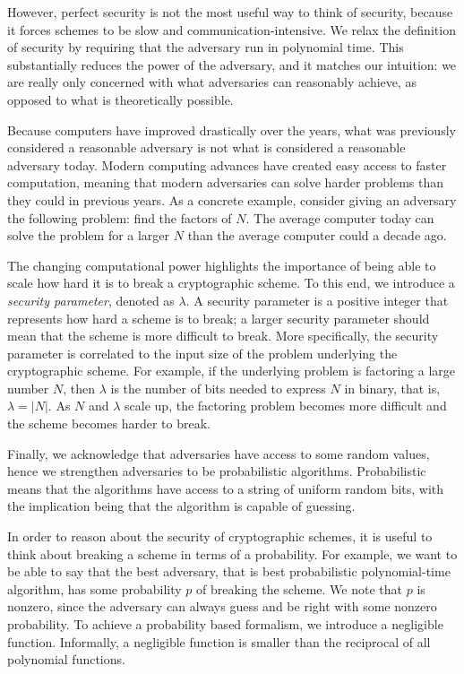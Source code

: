 However, perfect security is not the most useful way to think of security, because it forces schemes to be slow and communication-intensive.
We relax the definition of security by requiring that the adversary run in polynomial time. 
This substantially reduces the power of the adversary, and it matches our intuition: we are really only concerned with what adversaries can reasonably achieve, as opposed to what is theoretically possible. 

Because computers have improved drastically over the years, what was previously considered a reasonable adversary is not what is considered a reasonable adversary today. 
Modern computing advances have created easy access to faster computation, meaning that modern adversaries can solve harder problems than they could in previous years. 
As a concrete example, consider giving an adversary the following problem: find the factors of $N$. 
The average computer today can solve the problem for a larger $N$ than the average computer could a decade ago.

The changing computational power highlights the importance of being able to scale how hard it is to break a cryptographic scheme.
To this end, we introduce a \textit{security parameter}, denoted as $\lambda$.
A security parameter is a positive integer that represents how hard a scheme is to break; a larger security parameter should mean that the scheme is more difficult to break. 
More specifically, the security parameter is correlated to the input size of the problem underlying the cryptographic scheme. 
For example, if the underlying problem is factoring a large number $N$, then $\lambda$ is the number of bits needed to express $N$ in binary, that is, $\lambda = |N|$.
As $N$ and $\lambda$ scale up, the factoring problem becomes more difficult and the scheme becomes harder to break. 

Finally, we acknowledge that adversaries have access to some random values, hence we strengthen adversaries to be probabilistic algorithms. 
Probabilistic means that the algorithms have access to a string of uniform random bits, with the implication being that the algorithm is capable of guessing. 

In order to reason about the security of cryptographic schemes, it is useful to think about breaking a scheme in terms of a probability. 
For example, we want to be able to say that the best adversary, that is best probabilistic polynomial-time algorithm, has some probability $p$ of breaking the scheme. 
We note that $p$ is nonzero, since the adversary can always guess and be right with some nonzero probability. 
To achieve a probability based formalism, we introduce a negligible function.
Informally, a negligible function is smaller than the reciprocal of all polynomial functions.

